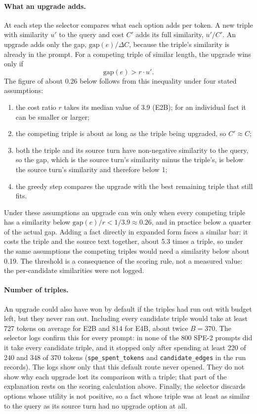 \paragraph{What an upgrade adds.} At each step the selector compares what each option adds per token. A new
triple with similarity $u'$ to the query and cost $C'$ adds its full similarity, $u'/C'$. An
upgrade adds only the gap,
$\text{gap}(e)/\Delta C$, because the triple's similarity is already in the prompt. For a competing
triple of similar length, the upgrade wins only if
\begin{equation}
  \text{gap}(e) > r \cdot u' .
\end{equation}
The figure of about 0.26 below follows from this inequality under four stated assumptions:
\begin{enumerate}
  \item the cost ratio $r$ takes its median value of 3.9 (E2B); for an individual fact it can be
        smaller or larger;
  \item the competing triple is about as long as the triple being upgraded, so $C' \approx C$;
  \item both the triple and its source turn have non-negative similarity to the query, so the gap,
        which is the source turn's similarity minus the triple's, is below the source turn's
        similarity and therefore below 1;
  \item the greedy step compares the upgrade with the best remaining triple that still fits.
\end{enumerate}
Under these assumptions an upgrade can win only when every competing triple has a similarity below
$\text{gap}(e)/r < 1/3.9 \approx 0.26$, and in practice below a quarter of the actual gap. Adding a
fact directly in expanded form faces a similar bar: it costs the triple and the source text
together, about 5.3 times a triple, so under the same assumptions the competing triples would need a
similarity below about 0.19. The threshold is a consequence of the scoring rule, not a measured
value: the per-candidate similarities were not logged.

\paragraph{Number of triples.} An upgrade could also have won by default if the triples had run out
with budget left, but they never ran out. Including every candidate triple would take at least 727
tokens on average for E2B and 814 for E4B, about twice $B=370$. The selector logs confirm this for
every prompt: in none of the 800 SPE-2 prompts did it take every candidate triple, and it stopped only
after spending at least 220 of 240 and 348 of 370 tokens (\texttt{spe\_spent\_tokens} and
\texttt{candidate\_edges} in the run records). The logs show only that this default route never
opened. They do not show why each upgrade lost its comparison with a triple; that part of the
explanation rests on the scoring calculation above. Finally, the selector discards options whose
utility is not positive, so a fact whose triple was at least as similar to the query as its source
turn had no upgrade option at all.

